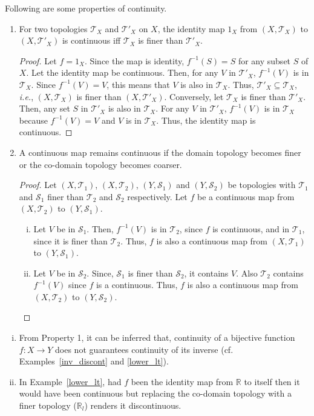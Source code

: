 \documentclass[a4paper,english,12pt]{article}
\begin{document}
Following are some properties of continuity.
\begin{enumerate}
\item For two topologies $\mathcal{T}_X$ and $\mathcal{T}'_X$ on $X$, the identity map $1_X$ from $(X,\mathcal{T}_X)$ to $(X,\mathcal{T}'_X)$ is continuous iff $\mathcal{T}_X$ is finer than $\mathcal{T}'_X$.
\begin{proof}
Let $f=1_X$. Since the map is identity, $f^{-1}(S)=S$ for any subset $S$ of $X$. Let the identity map be continuous. Then, for any $V$ in $\mathcal{T}'_X$, $f^{-1}(V)$ is in $\mathcal{T}_X$. Since $f^{-1}(V)=V$, this means that $V$ is also in $\mathcal{T}_X$. Thus, $\mathcal{T}'_X\subseteq \mathcal{T}_X$, \emph{i.e.}, $(X,\mathcal{T}_X)$ is finer than $(X,\mathcal{T}'_X)$.
Conversely, let $\mathcal{T}_X$ is finer than $\mathcal{T}'_X$. Then, any set $S$ in $\mathcal{T}'_X$ is also in $\mathcal{T}_X$. For any $V$ in $\mathcal{T}'_X$, $f^{-1}(V)$ is in $\mathcal{T}_X$ because $f^{-1}(V)=V$ and $V$ is in $\mathcal{T}_X$. Thus, the identity map is continuous.
\end{proof}

\item A continuous map remains continuous if the domain topology becomes finer or the co-domain topology becomes coarser.
\begin{proof}
Let $(X,\mathcal{T}_1)$, $(X,\mathcal{T}_2)$, $(Y,\mathcal{S}_1)$ and $(Y,\mathcal{S}_2)$ be topologies with $\mathcal{T}_1$ and $\mathcal{S}_1$ finer than $\mathcal{T}_2$ and $\mathcal{S}_2$ respectively. Let $f$ be a continuous map from $(X,\mathcal{T}_2)$ to $(Y,\mathcal{S}_1)$. 
\begin{enumerate}[i)]
\item Let $V$ be in $\mathcal{S}_1$. Then, $f^{-1}(V)$ is in $\mathcal{T}_2$, since $f$ is continuous, and in $\mathcal{T}_1$, since it is finer than $\mathcal{T}_2$. Thus, $f$ is also a continuous map from $(X,\mathcal{T}_1)$ to $(Y,\mathcal{S}_1)$.
\item Let $V$ be in $\mathcal{S}_2$. Since, $\mathcal{S}_1$ is finer than $\mathcal{S}_2$, it contains $V$. Also $\mathcal{T}_2$ contains $f^{-1}(V)$ since $f$ is a continuous. Thus, $f$ is also a continuous map from $(X,\mathcal{T}_2)$ to $(Y,\mathcal{S}_2)$.
\end{enumerate}
\end{proof}

\end{enumerate}

\begin{note} \begin{enumerate}[i)]
\item From Property 1, it can be inferred that, continuity of a bijective function $f:X\rightarrow Y$ does not guarantees continuity of its inverse (cf. Examples~\ref{inv_discont} and \ref{lower_lt}).
\item In Example~\ref{lower_lt}, had $f$ been the identity map from $\mathbb{R}$ to itself then it would have been continuous but replacing the co-domain topology with a finer topology ($\mathbb{R}_l$) renders it discontinuous.
\end{enumerate} 

\end{note}
\end{document}
